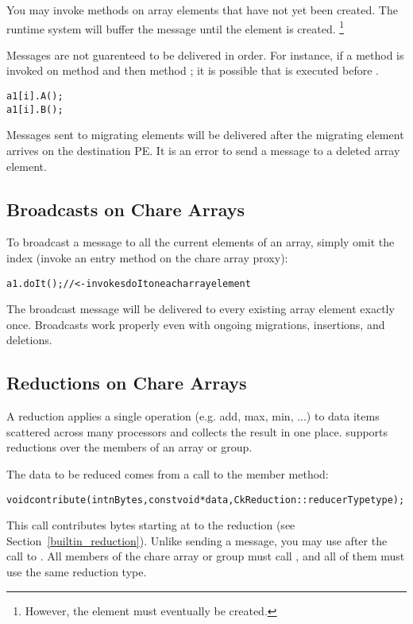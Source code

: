 You may invoke methods on array elements that have not yet been created. The
\charmpp{} runtime system will buffer the message until the element is
created. 
\footnote{However, the element must eventually be created.}

Messages are not guarenteed to be delivered in order. For instance, if a method
is invoked on method  and then method ; it is possible that 
is executed before .
%
\begin{alltt}
a1[i].A();
a1[i].B();
\end{alltt}

Messages sent to migrating elements will be delivered after the migrating
element arrives on the destination PE. It is an error to send a message
to a deleted array element.

\subsection{Broadcasts on Chare Arrays}

To  broadcast a message to all the current elements of
an array, simply omit the index (invoke an entry method on the chare array
proxy):
%
\begin{alltt}
a1.doIt(); //<- invokes doIt on each array element
\end{alltt}
%
The broadcast message will be delivered to every existing array element exactly
once. Broadcasts work properly even with ongoing migrations, insertions, and
deletions.

\subsection{Reductions on Chare Arrays}
\label{reductions}

A reduction applies a single operation (e.g. add,
max, min, ...) to data items scattered across many processors and
collects the result in one place.  \charmpp{} supports reductions
over the members of an array or group.

The data to be reduced comes from a call to the member  
method:
\begin{alltt}
void contribute(int nBytes, const void *data, CkReduction::reducerType type);
\end{alltt}

This call contributes  bytes starting at  to the
reduction  (see Section~\ref{builtin_reduction}).  Unlike sending a
message, you may use  after the call to .  All
members of the chare array or group must call , 
and all of them must use the same reduction type.  


